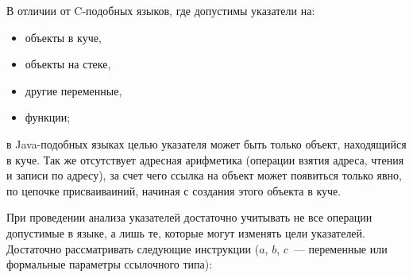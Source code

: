 \documentclass[14pt,titlepage]{extarticle}
\begin{document}
      В отличии от C-подобных языков, где допустимы указатели на:
      \begin{itemize}
        \item объекты в куче,
        \item объекты на стеке,
        \item другие переменные,
        \item функции;
      \end{itemize}
      в Java-подобных языках целью
      указателя может быть только объект, находящийся в куче. Так же
      отсутствует адресная арифметика (операции взятия адреса,
      чтения и записи по адресу), за счет чего ссылка на объект может
      появиться только явно, по цепочке присваиваиний, начиная с создания этого
      объекта в куче.

      При проведении анализа указателей достаточно учитывать не все операции
      допустимые в языке, а лишь те, которые могут изменять цели указателей.
      Достаточно рассматривать следующие инструкции ($a$, $b$, $c$~---
      переменные или формальные параметры ссылочного типа):
\end{document}

